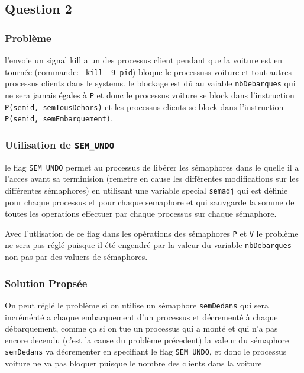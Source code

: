 \subsection{Question 2}

\subsubsection{Problème }

l'envoie un signal kill a un des processus client pendant que la
voiture est en tournée (commande: \texttt{ kill -9 pid}) bloque le processuss
voiture et tout autres processus clients dans le systems. le
blockage est dû au vaiable \texttt{nbDebarques} qui ne sera jamais égales à
\texttt{P} et donc le processus voiture se block dans l'instruction
\texttt{P(semid, semTousDehors)} et les processus clients se block dans
l'instruction \texttt{P(semid, semEmbarquement)}.

\subsubsection{Utilisation de \texttt{SEM\_UNDO}}

le flag \texttt{SEM\_UNDO} permet au processus de libérer les sémaphores dans le
quelle il a l'acces avant sa terminision  (remetre en cause les
différentes modifications sur les différentes sémaphores) en utilisant une variable special
\texttt{semadj} qui est définie pour chaque processus et pour chaque semaphore
et qui sauvgarde la somme de toutes les operations effectuer par chaque
processus sur chaque sémaphore.

Avec l'utlisation de ce flag dans les opérations des sémaphores
\texttt{P} et \texttt{V} le problème ne sera pas réglé puisque il été
engendré par la valeur du variable \texttt{nbDebarques} non pas par des valuers
de sémaphores.

\subsubsection{Solution Propsée}

On peut réglé le problème si on utilise un sémaphore \texttt{semDedans} qui sera
incréménté a chaque embarquement d'un processus et décrementé à chaque
débarquement, comme ça si on tue un processus qui a monté et qui n'a pas encore
decendu (c'est la cause du problème précedent) la valeur du sémaphore
\texttt{semDedans} va décrementer en specifiant le flag \texttt{SEM\_UNDO}, et
donc le processus voiture ne va pas bloquer puisque le nombre des clients dans
la voiture 

